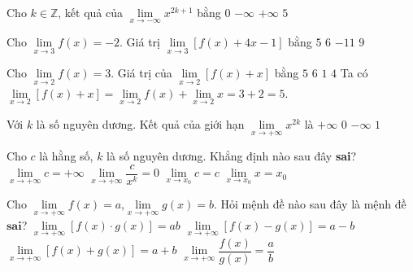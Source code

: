 \begin{ex}%
	Cho $k\in \mathbb{Z}$, kết quả của $\lim\limits_{x \to -\infty} x^{2k+1}$ bằng
	\choice
	{$0$}
	{\True $-\infty$}
	{$+\infty$}
	{$5$}
\end{ex}


\begin{ex}%
	Cho $\displaystyle\lim\limits_{x \to 3} f(x) =-2$. Giá trị $\displaystyle\lim\limits_{x \to 3} \left[f(x)+4x-1\right]$ bằng
	\choice
	{$5$}
	{$6$}
	{$-11$}
	{\True $9$}
\end{ex}


\begin{ex}%
	Cho $\lim\limits_{x\to 2}f(x)=3$. Giá trị của $\lim\limits_{x \to 2}\left[f(x)+x\right]$ bằng
	\choice
	{\True $5$}
	{$6$}
	{$1$}
	{$4$}
	\loigiai
	{
		Ta có $\lim\limits_{x \to 2}\left[f(x)+x\right] = \lim\limits_{x \to 2}f(x) + \lim\limits_{x \to 2}x = 3+2=5$.
	}
\end{ex}


\begin{ex}%
	Với $k$ là số nguyên dương. Kết quả của giới hạn $\lim\limits_{x\to+\infty}x^{2k}$ là
	\choice
	{\True $+\infty$}
	{$0$}
	{$-\infty$}
	{$1$}
\end{ex}


\begin{ex}%
	Cho $c$ là hằng số, $k$ là số nguyên dương. Khẳng định nào sau đây \textbf{sai}?	
	\choice
	{\True $\lim\limits_{ x \rightarrow +\infty}c=+\infty$}
	{$\lim\limits_{ x \rightarrow +\infty}\dfrac{c}{x^k}=0$}
	{$\lim\limits_{ x \rightarrow x_0}c=c$}
	{$\lim\limits_{ x \rightarrow x_0}x=x_0$}
\end{ex}


\begin{ex}%
	Cho $\lim\limits_{x \to +\infty} f(x)=a$,$\lim\limits_{x \to +\infty} g(x)=b$. Hỏi mệnh đề nào sau đây là mệnh đề $\textbf{sai}$?
	\choice
	{$\lim\limits_{x \to +\infty} \left[f(x)\cdot g(x)\right]=ab$}
	{$\lim\limits_{x \to +\infty} \left[f(x)- g(x)\right]=a-b$}
	{$\lim\limits_{x \to +\infty} \left[f(x)+ g(x)\right]=a+b$}
	{\True $\lim\limits_{x \to +\infty} \dfrac{f(x)}{g(x)}=\dfrac{a}{b}$}
\end{ex}


